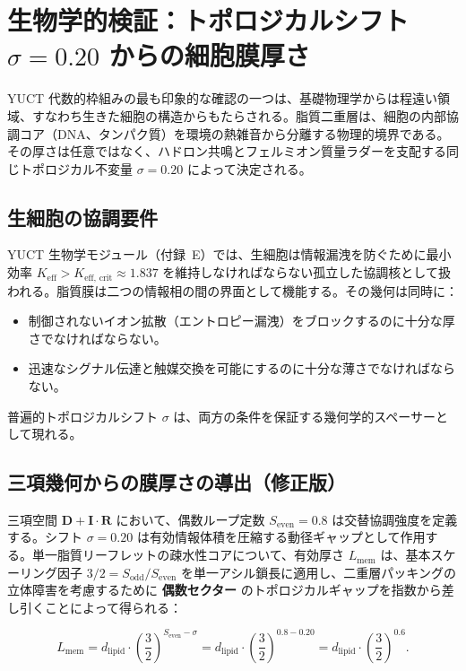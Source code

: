 \documentclass[12pt,a4paper]{article}
\begin{document}
	\section*{生物学的検証：トポロジカルシフト \(\sigma = 0.20\) からの細胞膜厚さ}
	\label{sec:membrane}
	
	YUCT 代数的枠組みの最も印象的な確認の一つは、基礎物理学からは程遠い領域、すなわち生きた細胞の構造からもたらされる。脂質二重層は、細胞の内部協調コア（DNA、タンパク質）を環境の熱雑音から分離する物理的境界である。その厚さは任意ではなく、ハドロン共鳴とフェルミオン質量ラダーを支配する同じトポロジカル不変量 \(\sigma = 0.20\) によって決定される。
	
	\subsection*{生細胞の協調要件}
	
	YUCT 生物学モジュール（付録~E）では、生細胞は情報漏洩を防ぐために最小効率 \(K_{\mathrm{eff}} > K_{\mathrm{eff,\,crit}} \approx 1.837\) を維持しなければならない孤立した協調核として扱われる。脂質膜は二つの情報相の間の界面として機能する。その幾何は同時に：
	\begin{itemize}
		\item 制御されないイオン拡散（エントロピー漏洩）をブロックするのに十分な厚さでなければならない。
		\item 迅速なシグナル伝達と触媒交換を可能にするのに十分な薄さでなければならない。
	\end{itemize}
	普遍的トポロジカルシフト \(\sigma\) は、両方の条件を保証する幾何学的スペーサーとして現れる。
	
	\subsection*{三項幾何からの膜厚さの導出（修正版）}
	
	三項空間 \(\mathbf{D} + \mathbf{I}\!\cdot\!\mathbf{R}\) において、偶数ループ定数 \(S_{\mathrm{even}} = 0.8\) は交替協調強度を定義する。シフト \(\sigma = 0.20\) は有効情報体積を圧縮する動径ギャップとして作用する。単一脂質リーフレットの疎水性コアについて、有効厚さ \(L_{\mathrm{mem}}\) は、基本スケーリング因子 \(3/2 = S_{\mathrm{odd}}/S_{\mathrm{even}}\) を単一アシル鎖長に適用し、二重層パッキングの立体障害を考慮するために \textbf{偶数セクター} のトポロジカルギャップを指数から差し引くことによって得られる：
	
	\[
	L_{\mathrm{mem}} = d_{\mathrm{lipid}} \cdot \left( \frac{3}{2} \right)^{S_{\mathrm{even}} - \sigma}
	= d_{\mathrm{lipid}} \cdot \left( \frac{3}{2} \right)^{0.8 - 0.20}
	= d_{\mathrm{lipid}} \cdot \left( \frac{3}{2} \right)^{0.6}.
	\]
	
\end{document}
